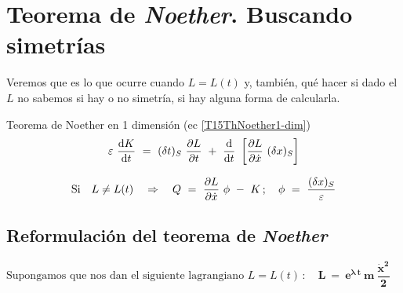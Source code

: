 \chapter{Teorema de \emph{Noether}. Buscando simetrías}


\vspace{10mm}
\begin{adjustwidth}{50pt}{50pt}
\begin{ejemplo}


Veremos que es lo que ocurre cuando $L=L(t)$ y, también, qué hacer si dado el $L$ no sabemos si hay o no simetría, si hay alguna forma de calcularla.


\end{ejemplo}
\end{adjustwidth}
\vspace{5mm}

\begin{myalertblock}{Teorema de Noether en 1 dimensión (ec \ref{T15ThNoether1-dim})}
	\begin{equation}
	\label{T17TN1d}
	\varepsilon \ \dv{K}{t} \ = \ (\var t)_S \ \pdv{L}{t} \ + \ \dv{t} \ \left[ \pdv{L}{\dot x} \ (\var x)_S \right]	
	\end{equation}
	
	\begin{equation}
		\text{Si } \ \ L\neq L(t) \quad \Rightarrow \quad Q \ = \ \pdv{L}{\dot x} \ \phi \ - \ K \, ; \quad \phi \ = \ \dfrac{(\var x)_S}{\varepsilon}
  	\end{equation}

\end{myalertblock}


\section{Reformulación del teorema de \emph{Noether}}

\begin{example}
	
\begin{equation}
\label{T16Lej1}
\text{Supongamos que nos dan el siguiente lagrangiano } L=L(t)\, : \quad \boldsymbol{ L \ = \ e^{\lambda \ t} \ m \ \dfrac {\dot x^2}{2}	} \qquad
\end{equation}
\end{example}

